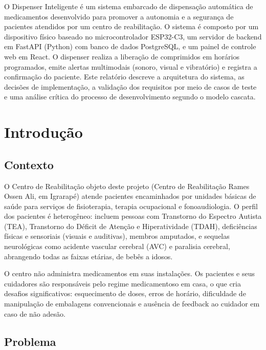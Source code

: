 \documentclass[12pt,a4paper]{article}
\begin{document}
O Dispenser Inteligente é um sistema embarcado de dispensação automática de medicamentos desenvolvido para promover a autonomia e a segurança de pacientes atendidos por um centro de reabilitação. O sistema é composto por um dispositivo físico baseado no microcontrolador ESP32-C3, um servidor de backend em FastAPI (Python) com banco de dados PostgreSQL, e um painel de controle web em React. O dispenser realiza a liberação de comprimidos em horários programados, emite alertas multimodais (sonoro, visual e vibratório) e registra a confirmação do paciente. Este relatório descreve a arquitetura do sistema, as decisões de implementação, a validação dos requisitos por meio de casos de teste e uma análise crítica do processo de desenvolvimento segundo o modelo cascata.

\newpage

\section{Introdução}

\subsection{Contexto}

O Centro de Reabilitação objeto deste projeto (Centro de Reabilitação Rames Ossen Ali, em Igrarapé) atende pacientes encaminhados por unidades básicas de saúde para serviços de fisioterapia, terapia ocupacional e fonoaudiologia. O perfil dos pacientes é heterogêneo: incluem pessoas com Transtorno do Espectro Autista (TEA), Transtorno do Déficit de Atenção e Hiperatividade (TDAH), deficiências físicas e sensoriais (visuais e auditivas), membros amputados, e sequelas neurológicas como acidente vascular cerebral (AVC) e paralisia cerebral, abrangendo todas as faixas etárias, de bebês a idosos.

O centro não administra medicamentos em suas instalações. Os pacientes e seus cuidadores são responsáveis pelo regime medicamentoso em casa, o que cria desafios significativos: esquecimento de doses, erros de horário, dificuldade de manipulação de embalagens convencionais e ausência de feedback ao cuidador em caso de não adesão.

\subsection{Problema}
\end{document}
